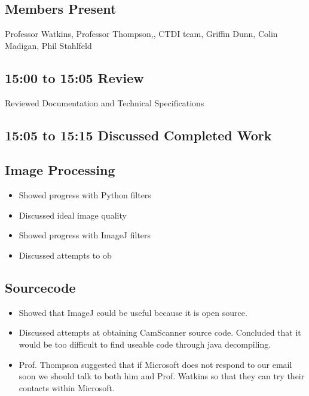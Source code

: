 \documentclass[]{article}
\begin{document}
			\subsection{Members Present}
				Professor Watkins, Professor Thompson,, CTDI team, Griffin Dunn, Colin Madigan, Phil Stahlfeld
			\subsection{15:00 to 15:05 Review}
				
				Reviewed Documentation and Technical Specifications \\
				
			\subsection{15:05 to 15:15 Discussed Completed Work}
				
				\subsection{Image Processing}
					\begin{itemize}
						\item Showed progress with Python filters
						\item Discussed ideal image quality
						\item Showed progress with ImageJ filters
						\item Discussed attempts to ob
					\end{itemize}
				
				\subsection{Sourcecode}
					\begin{itemize}
						\item Showed that ImageJ could be useful because it is open source. \\
						\item Discussed attempts at obtaining CamScanner source code. Concluded that it would be too difficult to find useable code through java decompiling. \\
						\item Prof. Thompson suggested that if Microsoft does not respond to our email soon we should talk to both him and Prof. Watkins so that they can try their contacts within Microsoft. \\
					\end{itemize}
				
\end{document}
